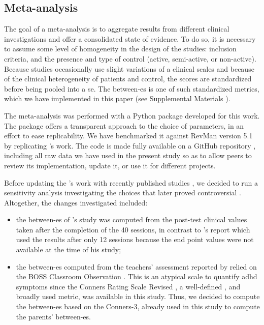 \subsection{Meta-analysis}

The goal of a meta-analysis is to aggregate results from different clinical investigations and offer a 
consolidated state of evidence. To do so, it is necessary to assume 
some level of homogeneity in the design of the studies: inclusion criteria, and the presence and type of control 
(active, semi-active, or non-active). Because studies occasionally 
use slight variations of a clinical scales and because of the clinical heterogeneity of patients and control, 
the scores are standardized before being pooled into a \gls{se}. The between-\gls{es} is one of such standardized metrics, 
which we have implemented in this paper (see Supplemental Materials \citep{Supplementalmaterial}). 

The meta-analysis was performed with a Python package developed for this work. The package offers a transparent 
approach to the choice of parameters, in an effort to ease replicability. We have benchmarked it against RevMan version 5.1 
\citep[UK, London]{RevMan} by replicating \citet{Cortese2016}'s work. 
The code is made fully available on a GitHub repository \citep{Bussalb2018}, including all raw data we have used
in the present study so as to allow peers to review its implementation, update it, or use it for different projects. 
 
Before updating the \citet{Cortese2016}'s work with recently published studies
\citep{Strehl2017, Baumeister2016}, we decided to run a sensitivity analysis investigating the choices 
that later proved controversial \citep{Micoulaud2016}. Altogether, the changes investigated included:
\begin{itemize}
\item the between-\gls{es} of \citeauthor{Arnold2014}'s study was computed from the post-test clinical values taken 
after the completion of the 40 sessions, in contrast to \citet{Cortese2016}'s report which used the results 
after only 12 sessions because the end point values were not available at the time of his study;
\item the between-\gls{es} computed from the teachers' assessment reported by \citet{Steiner2014} relied on the BOSS 
Classroom Observation \citep{Shapiro2010}. This is an atypical scale to quantify \gls{adhd} symptoms since 
the Conners Rating Scale Revised \citep{Conners1998, Christiansen2014, Bluschke2016}, a well-defined
\citep{Collett2003, Epstein2012}, and broadly used metric, was available in this study. Thus, we decided 
to compute the between-\gls{es} based on the Conners-3, already used in this study to compute the 
parents' between-\gls{es}.  
\end{itemize} 


